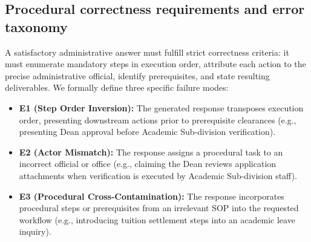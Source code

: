\documentclass[preprint,10pt]{elsarticle}
\begin{document}
\begin{table}[!htbp]
\centering
\caption{Characteristics of the 7 FSM Universitas Diponegoro SOP documents. ``PDF steps'' denotes numbered steps in official source documents; ``Graph steps'' denotes nodes in the curated workflow graph.}
\label{tab:corpus}
\small
\setlength{\tabcolsep}{4pt}
\end{table}

\subsection{Procedural correctness requirements and error taxonomy}
A satisfactory administrative answer must fulfill strict correctness criteria: it must enumerate mandatory steps in execution order, attribute each action to the precise administrative official, identify prerequisites, and state resulting deliverables. We formally define three specific failure modes:
\begin{itemize}[leftmargin=*]
\item \textbf{E1 (Step Order Inversion):} The generated response transposes execution order, presenting downstream actions prior to prerequisite clearances (e.g., presenting Dean approval before Academic Sub-division verification).
\item \textbf{E2 (Actor Mismatch):} The response assigns a procedural task to an incorrect official or office (e.g., claiming the Dean reviews application attachments when verification is executed by Academic Sub-division staff).
\item \textbf{E3 (Procedural Cross-Contamination):} The response incorporates procedural steps or prerequisites from an irrelevant SOP into the requested workflow (e.g., introducing tuition settlement steps into an academic leave inquiry).
\end{itemize}
\end{document}
